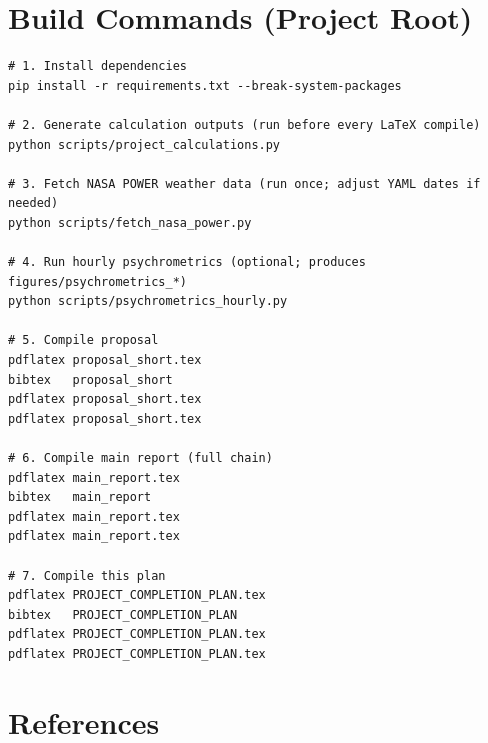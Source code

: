 \documentclass[11pt,a4paper]{article}
\begin{document}
\section{Build Commands (Project Root)}
\begin{verbatim}
# 1. Install dependencies
pip install -r requirements.txt --break-system-packages

# 2. Generate calculation outputs (run before every LaTeX compile)
python scripts/project_calculations.py

# 3. Fetch NASA POWER weather data (run once; adjust YAML dates if needed)
python scripts/fetch_nasa_power.py

# 4. Run hourly psychrometrics (optional; produces figures/psychrometrics_*)
python scripts/psychrometrics_hourly.py

# 5. Compile proposal
pdflatex proposal_short.tex
bibtex   proposal_short
pdflatex proposal_short.tex
pdflatex proposal_short.tex

# 6. Compile main report (full chain)
pdflatex main_report.tex
bibtex   main_report
pdflatex main_report.tex
pdflatex main_report.tex

# 7. Compile this plan
pdflatex PROJECT_COMPLETION_PLAN.tex
bibtex   PROJECT_COMPLETION_PLAN
pdflatex PROJECT_COMPLETION_PLAN.tex
pdflatex PROJECT_COMPLETION_PLAN.tex
\end{verbatim}

\section*{References}


\end{document}
